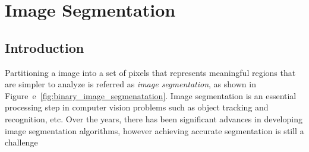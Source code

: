 \documentclass{WitsPhysicsReport}
\begin{document}



\section{Image Segmentation }
\label{sec:image_segmentation}
\subsection{Introduction}


Partitioning a image into a set of pixels that represents meaningful regions that are simpler to analyze is referred as \textit{image segmentation}, as shown in Figure~e~\ref{fig:binary_image_segmenatation}. Image segmentation is an essential processing step in computer vision problems such as object tracking and recognition, etc. Over the years, there has been significant advances in developing image segmentation algorithms, however achieving accurate segmentation is still a challenge
\end{document}
